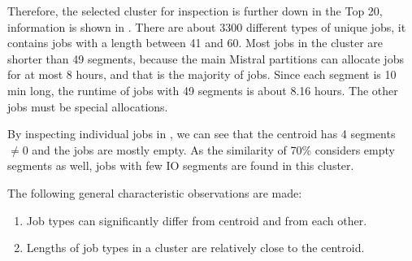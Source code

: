 \documentclass{jhps}
\makeatletter
\newcommand{\jk}[1]{\todo[inline]{JK:\@#1}}
\makeatother
\begin{document}
Therefore, the selected cluster for inspection is further down in the Top 20, information is shown in .
\jk{War es top 20?}
There are about 3300 different types of unique jobs, it contains jobs with a length between 41 and 60.
Most jobs in the cluster are shorter than 49 segments, because the main Mistral partitions can allocate jobs for at most 8 hours, and that is the majority of jobs.
Since each segment is 10 min long, the runtime of jobs with 49 segments is about 8.16 hours.
The other jobs must be special allocations.

By inspecting individual jobs in , we can see that the centroid has 4 segments $\neq 0$ and the jobs are mostly empty.
As the similarity of 70\% considers empty segments as well, jobs with few IO segments are found in this cluster.

The following general characteristic observations are made:
\begin{enumerate}
 \item Job types can significantly differ from centroid and from each other.
 \item Lengths of job types in a cluster are relatively close to the centroid.
\end{enumerate}
\end{document}
